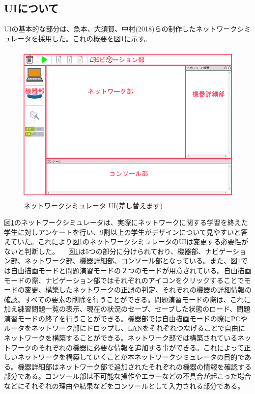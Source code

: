 \subsection{UIについて}
UIの基本的な部分は、魚本、大須賀、中村(2018)らの制作したネットワークシミュレータを採用した。これの概要を図\ref{fig:simu}に示す。

\begin{figure}[htbp]
  \begin{center}
    \includegraphics[clip,width=12.0cm,height=8.0cm]{img/simu.png}
    \caption{ネットワークシミュレータ UI(差し替えます)}
    \label{fig:simu}
  \end{center}
\end{figure}

図\ref{fig:simu}のネットワークシミュレータは、実際にネットワークに関する学習を終えた学生に対しアンケートを行い、9割以上の学生がデザインについて見やすいと答えていた。これにより図\ref{fig:simu}のネットワークシミュレータのUIは変更する必要性がないと判断した。
　図\ref{fig:simu}は5つの部分に分けられており、機器部、ナビゲーション部、ネットワーク部、機器詳細部、コンソール部となっている。また、図\ref{fig:simu}では自由描画モードと問題演習モードの２つのモードが用意されている。自由描画モードの際、ナビゲーション部ではそれぞれのアイコンをクリックすることでモードの変更、構築したネットワークの正誤の判定、それぞれの機器の詳細情報の確認、すべての要素の削除を行うことができる。問題演習モードの際は、これに加え練習問題一覧の表示、現在の状況のセーブ、セーブした状態のロード、問題演習モードの終了を行うことができる。機器部では自由描画モードの際にPCやルータをネットワーク部にドロップし、LANをそれぞれつなげることで自由にネットワークを構築することができる。ネットワーク部では構築されているネットワークのそれぞれの機器に必要な情報を追加する事ができる。これによって正しいネットワークを構築していくことが本ネットワークシミュレータの目的である。機器詳細部はネットワーク部で追加されたそれぞれの機器の情報を確認する部分である。コンソール部は不可能な操作やエラーなどの不具合が起こった場合などにそれぞれの理由や結果などをコンソールとして入力される部分である。
